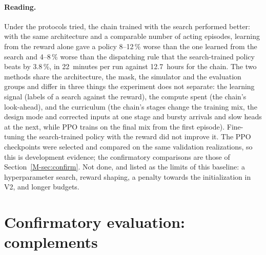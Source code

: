 \documentclass[11pt,a4paper]{article}
\theoremstyle{plain}
\theoremstyle{definition}
\theoremstyle{remark}
\begin{document}
\paragraph{Reading.}
Under the protocols tried, the chain trained with the search performed better: with the
same architecture and a comparable number of acting episodes, learning from the reward
alone gave a policy 8--12\,\% worse than the one learned from the search and 4--8\,\%
worse than the dispatching rule that the search-trained policy beats by 3.8\,\%, in
22~minutes per run against 12.7~hours for the chain. The two methods share the
architecture, the mask, the simulator and the evaluation groups and differ in three
things the experiment does not separate: the learning signal (labels of a search
against the reward), the compute spent (the chain's look-ahead), and the curriculum
(the chain's stages change the training mix, the design mode and corrected inputs at
one stage and bursty arrivals and slow heads at the next, while PPO trains on the
final mix from the first episode).
Fine-tuning the search-trained policy with the reward did not improve it. The PPO
checkpoints were selected and compared on the same validation realizations, so this is
development evidence; the confirmatory comparisons are those of Section~\ref{M-sec:confirm}.
Not done, and listed as the limits of this baseline: a hyperparameter search, reward
shaping, a penalty towards the initialization in V2, and longer budgets.

\section{Confirmatory evaluation: complements}\label{sec:confirmfull}
\end{document}
